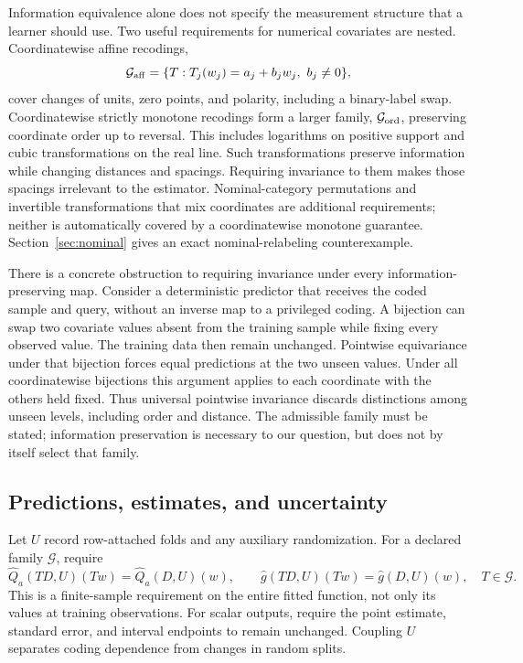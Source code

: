 \documentclass[11pt]{article}
\theoremstyle{definition}
\theoremstyle{remark}
\begin{document}
Information equivalence alone does not specify the measurement structure
that a learner should use. Two useful requirements for numerical covariates
are nested. Coordinatewise affine recodings,
\[
 \mathcal G_{\rm aff}=\{T:T_j(w_j)=a_j+b_jw_j,\ b_j\ne0\},
\]
cover changes of units, zero points, and polarity, including a binary-label
swap. Coordinatewise strictly monotone recodings form a larger family,
$\mathcal G_{\rm ord}$, preserving coordinate order up to reversal. This
includes logarithms on positive support and cubic transformations on the
real line. Such transformations preserve information while changing
distances and spacings. Requiring invariance to them makes those spacings
irrelevant to the estimator. Nominal-category permutations and invertible
transformations that mix coordinates are additional requirements; neither
is automatically covered by a coordinatewise monotone guarantee.
Section~\ref{sec:nominal} gives an exact nominal-relabeling counterexample.

There is a concrete obstruction to requiring invariance under every
information-preserving map. Consider a deterministic predictor that receives
the coded sample and query, without an inverse map to a privileged coding.
A bijection can swap two covariate values absent from the training sample
while fixing every observed value. The training data then remain unchanged.
Pointwise equivariance under that bijection forces equal predictions at the
two unseen values. Under all coordinatewise bijections this argument applies
to each coordinate with the others held fixed. Thus universal pointwise
invariance discards distinctions among unseen levels, including order and
distance. The admissible family must be stated; information preservation
is necessary to our question, but does not by itself select that family.

\subsection{Predictions, estimates, and uncertainty}

Let $U$ record row-attached folds and any auxiliary randomization. For a
declared family $\mathcal G$, require
\begin{equation}\label{eq:prediction-equivariance}
 \widehat Q_a(TD,U)(Tw)=\widehat Q_a(D,U)(w),\qquad
 \widehat g(TD,U)(Tw)=\widehat g(D,U)(w),
 \quad T\in\mathcal G.
\end{equation}
This is a finite-sample requirement on the entire fitted function, not only
its values at training observations. For scalar outputs, require the point
estimate, standard error, and interval endpoints to remain unchanged.
Coupling $U$ separates coding dependence from changes in random splits.
\end{document}
